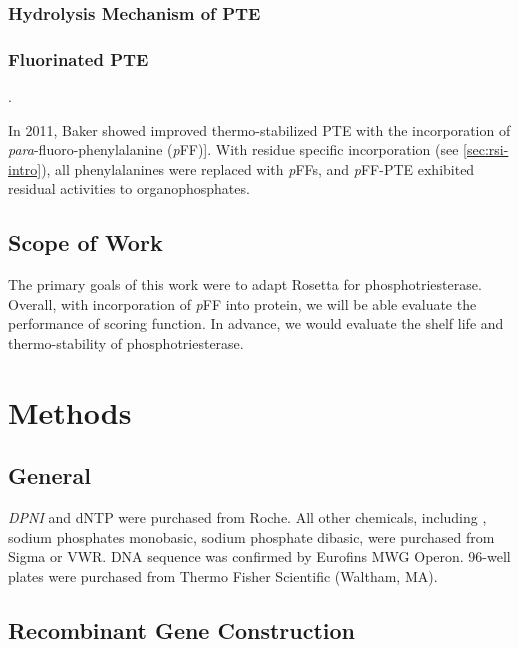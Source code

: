\begin{refsection}
\subsubsection{Hydrolysis Mechanism of PTE}

\subsubsection{Fluorinated PTE}.

In 2011, Baker  showed improved thermo-stabilized PTE with the
incorporation of \emph{para}-fluoro-phenylalanine
(\emph{p}FF)]\cite{Baker2011b}. With residue specific incorporation (see
\ref{sec:rsi-intro}), all phenylalanines were replaced with \emph{p}FFs, and
\emph{p}FF-PTE exhibited residual activities to organophosphates.

\subsection{Scope of Work}

The primary goals of this work were to adapt Rosetta for phosphotriesterase.
Overall, with incorporation of \emph{p}FF into protein, we will be able
evaluate the performance of scoring function. In advance, we would evaluate the
shelf life and thermo-stability of phosphotriesterase.

\section{Methods}

\subsection{General}

\emph{DPNI} and dNTP were purchased from Roche. All other chemicals, including
, sodium phosphates monobasic, sodium phosphate dibasic, were
purchased from Sigma or VWR. DNA sequence was confirmed by Eurofins MWG Operon.
96-well plates were purchased from Thermo Fisher Scientific (Waltham, MA).

\subsection{Recombinant Gene Construction}


\end{refsection}
